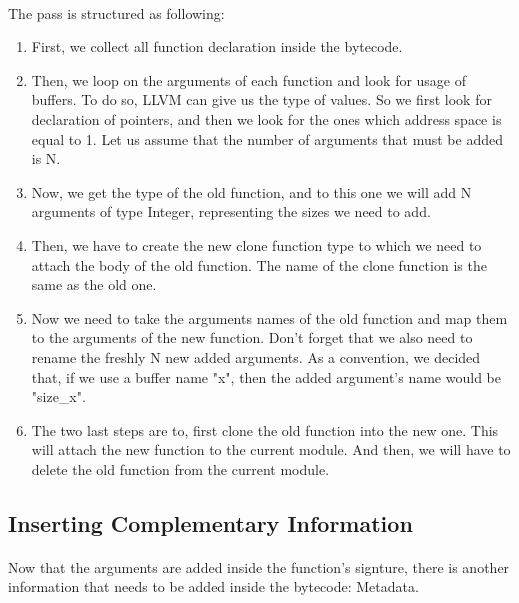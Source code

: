\documentclass{article}
\begin{document}
\begin{itemize}
\paragraph{}
The pass is structured as following:
\begin{enumerate}
\item First, we collect all function declaration inside the bytecode.
\item Then, we loop on the arguments of each function and look for usage of buffers. To do so, LLVM can give us the type of values. So we first look for declaration of pointers, and then we look for the ones which address space is equal to 1. Let us assume that the number of arguments that must be added is N.
\item Now, we get the type of the old function, and to this one we will add N arguments of type Integer, representing the sizes we need to add.
\item Then, we have to create the new clone function type to which we need to attach the body of the old function. The name of the clone function is the same as the old one.
\item Now we need to take the arguments names of the old function and map them to the arguments of the new function. Don't forget that we also need to rename the freshly N new added arguments. As a convention, we decided that, if we use a buffer name "x", then the added argument's name would be "size\_x".
\item The two last steps are to, first clone the old function into the new one. This will attach the new function to the current module. And then, we will have to delete the old function from the current module. 

\end{enumerate}

\subsection{Inserting Complementary Information}

\paragraph{}
Now that the arguments are added inside the function's signture, there is another information that needs to be added inside the bytecode: Metadata.


\end{itemize}
\end{document}
